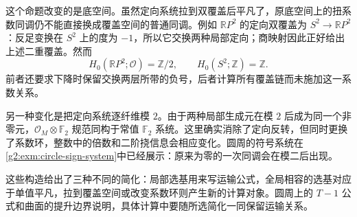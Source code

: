 这个命题改变的是底空间。虽然定向系统拉到双覆盖后平凡了，原底空间上的扭系数同调仍不能直接换成覆盖空间的普通同调。例如 \(\mathbb RP^2\) 的定向双覆盖为 \(S^2\to\mathbb RP^2\)：反足变换在 \(S^2\) 上的度为 \( -1\)，所以它交换两种局部定向；商映射因此正好给出上述二重覆盖。然而
\[
	H_0(\mathbb RP^2;\mathcal O)=\mathbb Z/2,
	\qquad H_0(S^2;\mathbb Z)=\mathbb Z.
\]
前者还要求下降时保留交换两层所带的负号，后者计算所有覆盖链而未施加这一系数关系。

\ProseParagraphBreak

另一种变化是把定向系统逐纤维模 \(2\)。由于两种局部生成元在模 \(2\) 后成为同一个非零元，\(\mathcal O_M\otimes\mathbb F_2\) 规范同构于常值 \(\mathbb F_2\) 系统。这里确实消除了定向反转，但同时更换了系数环，整数中的倍数和二阶挠信息会相应变化。圆周的符号系统在\cref{g2:exm:circle-sign-system}中已经展示：原来为零的一次同调会在模二后出现。

\ProseParagraphBreak

这些构造给出了三种不同的简化：局部选基用来写运输公式，全局相容的选基对应于单值平凡，拉到覆盖空间或改变系数环则产生新的计算对象。圆周上的 \(T-1\) 公式和曲面的提升边界说明，具体计算中要随所选简化一同保留运输关系。
